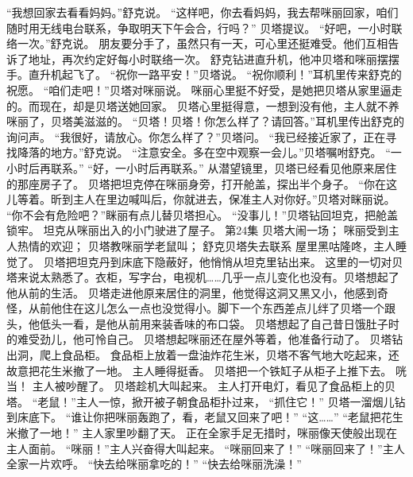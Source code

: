 \documentclass[a4paper,12pt,UTF8,twoside]{ctexbook}
\begin{document}
        “我想回家去看看妈妈。”舒克说。 
        “这样吧，你去看妈妈，我去帮咪丽回家，咱们随时用无线电台联系，争取明天下午会合，行吗？” 贝塔提议。 
        “好吧，一小时联络一次。”舒克说。 
        朋友要分手了，虽然只有一天，可心里还挺难受。他们互相告诉了地址，再次约定好每小时联络一次。 
        舒克钻进直升机，他冲贝塔和咪丽摆摆手。直升机起飞了。 
        “祝你一路平安！”贝塔说。 
        “祝你顺利！”耳机里传来舒克的祝愿。 
        “咱们走吧！”贝塔对咪丽说。 
        咪丽心里挺不好受，是她把贝塔从家里逼走的。而现在，却是贝塔送她回家。 
        贝塔心里挺得意，一想到没有他，主人就不养咪丽了，贝塔美滋滋的。 
        “贝塔！贝塔！你怎么样了？请回答。”耳机里传出舒克的询问声。 
        “我很好，请放心。你怎么样了？”贝塔问。 
        “我已经接近家了，正在寻找降落的地方。”舒克说。 
        “注意安全。多在空中观察一会儿。”贝塔嘱咐舒克。 
        “一小时后再联系。” 
        “好，一小时后再联系。” 
        从潜望镜里，贝塔已经看见他原来居住的那座房子了。 
        贝塔把坦克停在咪丽身旁，打开舱盖，探出半个身子。 
        “你在这儿等着。昕到主人在里边喊叫后，你就进去，保准主人对你好。”贝塔对眯丽说。 
        “你不会有危险吧？”眯丽有点儿替贝塔担心。 
        “没事儿！”贝塔钻回坦克，把舱盖锁牢。 
        坦克从咪丽出入的小门驶进了屋子。   第24集 
        贝塔大闹一场； 
        咪丽受到主人热情的欢迎； 
        贝塔教咪丽学老鼠叫； 
        舒克贝塔失去联系   
        屋里黑咕隆咚，主人睡觉了。 
        贝塔把坦克丹到床底下隐蔽好，他悄悄从坦克里钻出来。 
        这里的一切对贝塔来说太熟悉了。衣柜，写字台，电视机……几乎一点儿变化也没有。贝塔想起了他从前的生活。 
        贝塔走进他原来居住的洞里，他觉得这洞又黑又小，他感到奇怪，从前他住在这儿怎么一点也没觉得小。脚下一个东西差点儿绊了贝塔一个跟头，他低头一看，是他从前用来装香味的布口袋。 
        贝塔想起了自己昔日饿肚子时的难受劲儿，他可怜自己。 
        贝塔想起咪丽还在屋外等着，他准备行动了。 
        贝塔钻出洞，爬上食品柜。 
        食品柜上放着一盘油炸花生米，贝塔不客气地大吃起来，还故意把花生米撤了一地。 
        主人睡得挺香。 
        贝塔把一个铁缸子从柜子上推下去。 
        咣当！ 
        主人被吵醒了。 
        贝塔趁机大叫起来。 
        主人打开电灯，看见了食品柜上的贝塔。 
        “老鼠！”主人一惊，掀开被子朝食品柜扑过来， 
        “抓住它！” 
        贝塔一溜烟儿钻到床底下。 
        “谁让你把咪丽轰跑了，看，老鼠又回来了吧！” 
        “这……” 
        “老鼠把花生米撤了一地！” 
        主人家里吵翻了天。 
        正在全家手足无措时，咪丽像天使般出现在主人面前。 
        “咪丽！”主人兴奋得大叫起来。 
        “咪丽回来了！” 
        “咪丽回来了！”主人全家一片欢呼。 
        “快去给咪丽拿吃的！” 
        “快去给咪丽洗澡！” 
\end{document}
